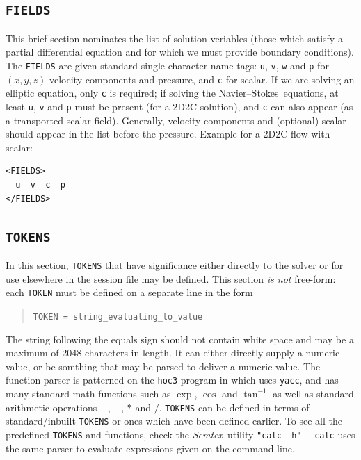 \documentclass[11pt]{report}
\newcommand{\Semtex}{\emph{Semtex}} \newcommand{\Dog}{\emph{Dog}}
\newcommand\NavSto{Navier--Stokes}
\begin{document}
\subsection{\texttt{FIELDS}}
\label{sec.fields}


This brief section nominates the list of solution veriables (\ie those
which satisfy a partial differential equation and for which we must
provide boundary conditions).  The \verb|FIELDS| are given standard
single-character name-tags: \verb|u|, \verb|v|, \verb|w| and \verb|p|
for $(x,y,z)$ velocity components and pressure, and \verb|c| for
scalar.  If we are solving an elliptic equation, only \verb|c| is
required; if solving the \NavSto\ equations, at least \verb|u|,
\verb|v| and \verb|p| must be present (for a 2D2C solution), and
\verb|c| can also appear (as a transported scalar field).  Generally,
velocity components and (optional) scalar should appear in the list
before the pressure. Example for a 2D2C flow with scalar:
%
{\small
\begin{verbatim}
<FIELDS>
  u  v  c  p
</FIELDS>
\end{verbatim}
}

\subsection{\texttt{TOKENS}}
\label{sec.tokens}

In this section, \verb|TOKENS| that have significance either directly
to the solver or for use elsewhere in the session file may be defined.
This section \emph{is not} free-form: each \verb|TOKEN| must be
defined on a separate line in the form
\begin{quote}
  \verb|TOKEN = string_evaluating_to_value|
\end{quote}
The string following the equals sign should not contain white space
and may be a maximum of 2048 characters in length.  It can either
directly supply a numeric value, or be somthing that may be parsed to
deliver a numeric value.  The function parser is patterned on the
\verb|hoc3| program in \citet{kernighan84} which uses \verb|yacc|, and
has many standard math functions such as $\exp$, $\cos$ and
$\tan^{-1}$ as well as standard arithmetic operations $+$, $-$, $\ast$
and $/$.  \verb|TOKENS| can be defined in terms of standard/inbuilt
\verb|TOKENS| or ones which have been defined earlier.  To see all the
predefined \verb|TOKENS| and functions, check the \Semtex\ utility
\verb|"calc -h"|\,---\,\verb|calc| uses the same parser to evaluate
expressions given on the command line.
\end{document}
